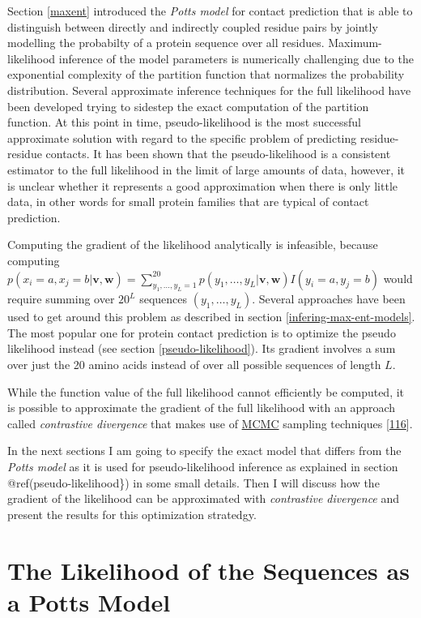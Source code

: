 \documentclass[12pt,a4paper,twoside]{book}
\newcommand{\eq}{\!=\!}
\renewcommand{\v}{\mathbf{v}}
\newcommand{\w}{\mathbf{w}}
\theoremstyle{definition}
\theoremstyle{definition}
\theoremstyle{remark}
\begin{document}
Section \ref{maxent} introduced the \emph{Potts model} for contact
prediction that is able to distinguish between directly and indirectly
coupled residue pairs by jointly modelling the probabilty of a protein
sequence over all residues. Maximum-likelihood inference of the model
parameters is numerically challenging due to the exponential complexity
of the partition function that normalizes the probability distribution.
Several approximate inference techniques for the full likelihood have
been developed trying to sidestep the exact computation of the partition
function. At this point in time, pseudo-likelihood is the most
successful approximate solution with regard to the specific problem of
predicting residue-residue contacts. It has been shown that the
pseudo-likelihood is a consistent estimator to the full likelihood in
the limit of large amounts of data, however, it is unclear whether it
represents a good approximation when there is only little data, in other
words for small protein families that are typical of contact prediction.

Computing the gradient of the likelihood analytically is infeasible,
because computing
\(p(x_i \eq a, x_j \eq b | \v, \w) = \sum_{y_1, \dots, y_L =1}^{20} p(y_1, \dots, y_L | \v, \w) I(y_i \eq a, y_j \eq b)\)
would require summing over \(20^L\) sequences \((y_1,\ldots,y_L)\).
Several approaches have been used to get around this problem as
described in section \ref{infering-max-ent-models}. The most popular one
for protein contact prediction is to optimize the pseudo likelihood
instead (see section \ref{pseudo-likelihood}). Its gradient involves a
sum over just the 20 amino acids instead of over all possible sequences
of length \(L\).

While the function value of the full likelihood cannot efficiently be
computed, it is possible to approximate the gradient of the full
likelihood with an approach called \emph{contrastive divergence} that
makes use of \protect\hyperlink{abbrev}{MCMC} sampling techniques
{[}\protect\hyperlink{ref-Hinton2002}{116}{]}.

In the next sections I am going to specify the exact model that differs
from the \emph{Potts model} as it is used for pseudo-likelihood
inference as explained in section @ref(pseudo-likelihood\}) in some
small details. Then I will discuss how the gradient of the likelihood
can be approximated with \emph{contrastive divergence} and present the
results for this optimization stratedgy.

\section{The Likelihood of the Sequences as a Potts
Model}\label{the-likelihood-of-the-sequences-as-a-potts-model}
\end{document}
